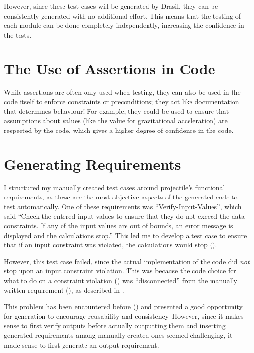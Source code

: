 However, since these test cases will be generated by Drasil, they can be
consistently generated with no additional effort. This means that the testing
of each module can be done completely independently, increasing the confidence
in the tests.

\section{The Use of Assertions in Code}
\label{chap:dev-proc:code-assertions}

While assertions are often only used when testing, they can also be used in
the code itself to enforce constraints or preconditions; they act like
documentation that determines behaviour! For example, they could be used to
ensure that assumptions about values (like the value for gravitational
acceleration) are respected by the code, which gives a higher degree of
confidence in the code.

\section{Generating Requirements}
\label{chap:dev-proc:gen-reqs}

I structured my manually created test cases around \acs{projectile}'s functional
requirements, as these are the most objective aspects of the generated code to
test automatically. One of these requirements was ``Verify-Input-Values'',
which said ``Check the entered input values to ensure that they do not exceed
the data constraints. If any of the input values are out of bounds, an error
message is displayed and the calculations stop.'' This led me to develop a test
case to ensure that if an input constraint was violated, the
calculations would stop ().

However, this test case failed,
since the actual implementation of the code did \emph{not} stop upon an input
constraint violation. This was because the code choice for what to do on a
constraint violation () was ``disconnected'' from the
manually written requirement (), as described in
. 

This problem has been encountered before () and presented a good
opportunity for generation to encourage reusability and consistency. However,
since it makes sense to first verify outputs before actually outputting them
and inserting generated requirements among manually created ones seemed
challenging, it made sense to first generate an output requirement.

